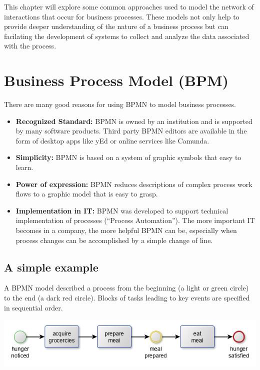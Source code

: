 \documentclass[]{book}
\providecommand{\tightlist}{%
  \setlength{\itemsep}{0pt}\setlength{\parskip}{0pt}}
\begin{document}
This chapter will explore some common approaches used to model the network of interactions that occur for business processes. These models not only help to provide deeper understanding of the nature of a business process but can facilating the development of systems to collect and analyze the data associated with the process.

\newpage

\hypertarget{business-process-model-bpm}{%
\section{Business Process Model (BPM)}\label{business-process-model-bpm}}

There are many good reasons for using BPMN to model business processes. \citep{Camunda2018a}

\begin{itemize}
\tightlist
\item
  \textbf{Recognized Standard:} BPMN is owned by an institution and is supported by many software products. Third party BPMN editors are available in the form of desktop apps like yEd \citep{YED2018} or online services like Camunda. \citep{Camunda2018b}
\item
  \textbf{Simplicity:} BPMN is based on a system of graphic symbols that easy to learn.
\item
  \textbf{Power of expression:} BPMN reduces descriptions of complex process work flows to a graphic model that is easy to grasp.
\item
  \textbf{Implementation in IT:} BPMN was developed to support technical implementation of processes (``Process Automation''). The more important IT becomes in a company, the more helpful BPMN can be, especially when process changes can be accomplished by a simple change of line.
\end{itemize}

\hypertarget{a-simple-example}{%
\subsection{A simple example}\label{a-simple-example}}

A BPMN model described a process from the beginning (a light or green circle) to the end (a dark red circle). Blocks of tasks leading to key events are specified in sequential order.

\includegraphics[width=1\linewidth]{images/simpleBPM}
\end{document}
